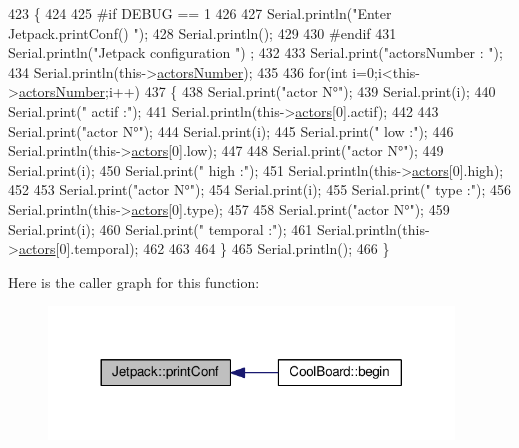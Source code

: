 \begin{DoxyCode}
423 \{
424 
425 \textcolor{preprocessor}{#if DEBUG == 1 }
426 
427     Serial.println(\textcolor{stringliteral}{"Enter Jetpack.printConf() "});
428     Serial.println();
429 
430 \textcolor{preprocessor}{#endif }
431     Serial.println(\textcolor{stringliteral}{"Jetpack configuration "}) ;
432 
433     Serial.print(\textcolor{stringliteral}{"actorsNumber : "});
434     Serial.println(this->\hyperlink{classJetpack_a52c86319cb3f7f1ab744a64db18a7ba5}{actorsNumber});
435  
436         \textcolor{keywordflow}{for}(\textcolor{keywordtype}{int} i=0;i<this->\hyperlink{classJetpack_a52c86319cb3f7f1ab744a64db18a7ba5}{actorsNumber};i++)
437     \{   
438         Serial.print(\textcolor{stringliteral}{"actor N°"});
439         Serial.print(i);
440         Serial.print(\textcolor{stringliteral}{" actif :"});
441         Serial.println(this->\hyperlink{classJetpack_a7e16d2f97837f9712a2e6de1c50d99db}{actors}[0].actif);
442 
443         Serial.print(\textcolor{stringliteral}{"actor N°"});
444         Serial.print(i);
445         Serial.print(\textcolor{stringliteral}{" low :"});
446         Serial.println(this->\hyperlink{classJetpack_a7e16d2f97837f9712a2e6de1c50d99db}{actors}[0].low);
447 
448         Serial.print(\textcolor{stringliteral}{"actor N°"});
449         Serial.print(i);
450         Serial.print(\textcolor{stringliteral}{" high :"});
451         Serial.println(this->\hyperlink{classJetpack_a7e16d2f97837f9712a2e6de1c50d99db}{actors}[0].high);
452 
453         Serial.print(\textcolor{stringliteral}{"actor N°"});
454         Serial.print(i);
455         Serial.print(\textcolor{stringliteral}{" type :"});
456         Serial.println(this->\hyperlink{classJetpack_a7e16d2f97837f9712a2e6de1c50d99db}{actors}[0].type);
457         
458         Serial.print(\textcolor{stringliteral}{"actor N°"});
459         Serial.print(i);
460         Serial.print(\textcolor{stringliteral}{" temporal :"});
461         Serial.println(this->\hyperlink{classJetpack_a7e16d2f97837f9712a2e6de1c50d99db}{actors}[0].temporal);
462  
463 
464     \}
465     Serial.println();
466 \}
\end{DoxyCode}
Here is the caller graph for this function\+:\nopagebreak
\begin{figure}[H]
\begin{center}
\leavevmode
\includegraphics[width=305pt]{classJetpack_ac54a7bb4f9166bee32052253d9b1d306_icgraph}
\end{center}
\end{figure}
\mbox{\label{classJetpack_a338f1af8cbc6504ac69b47c7328569b5}} 
